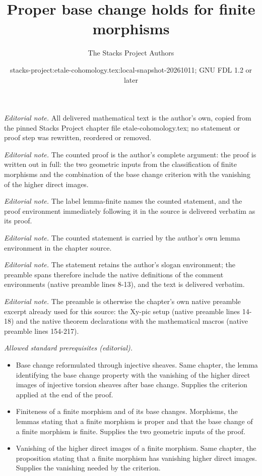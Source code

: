 \documentclass[10pt,a4paper]{amsart}
\title{Proper base change holds for finite morphisms}
\author{The Stacks Project Authors}
\date{stacks-project:etale-cohomology.tex:local-snapshot-20261011; GNU FDL 1.2 or later}
\theoremstyle{plain}
\theoremstyle{definition}
\theoremstyle{remark}
\numberwithin{equation}{subsection}
\begin{document}
\maketitle
\noindent\textit{Editorial note.} All delivered mathematical text is the author's own, copied from the pinned Stacks Project chapter file etale-cohomology.tex; no statement or proof step was rewritten, reordered or removed.\par\medskip
\noindent\textit{Editorial note.} The counted proof is the author's complete argument: the proof is written out in full: the two geometric inputs from the classification of finite morphisms and the combination of the base change criterion with the vanishing of the higher direct images.\par\medskip
\noindent\textit{Editorial note.} The label lemma-finite names the counted statement, and the proof environment immediately following it in the source is delivered verbatim as its proof.\par\medskip
\noindent\textit{Editorial note.} The counted statement is carried by the author's own lemma environment in the chapter source.\par\medskip
\noindent\textit{Editorial note.} The statement retains the author's slogan environment; the preamble spans therefore include the native definitions of the comment environments (native preamble lines 8-13), and the text is delivered verbatim.\par\medskip
\noindent\textit{Editorial note.} The preamble is otherwise the chapter's own native preamble excerpt already used for this source: the Xy-pic setup (native preamble lines 14-18) and the native theorem declarations with the mathematical macros (native preamble lines 154-217).\par\medskip
\noindent\textit{Allowed standard prerequisites (editorial).}\begin{itemize}
\item Base change reformulated through injective sheaves. Same chapter, the lemma identifying the base change property with the vanishing of the higher direct images of injective torsion sheaves after base change. Supplies the criterion applied at the end of the proof.
\item Finiteness of a finite morphism and of its base changes. Morphisms, the lemmas stating that a finite morphism is proper and that the base change of a finite morphism is finite. Supplies the two geometric inputs of the proof.
\item Vanishing of the higher direct images of a finite morphism. Same chapter, the proposition stating that a finite morphism has vanishing higher direct images. Supplies the vanishing needed by the criterion.
\end{itemize}\medskip
\end{document}
